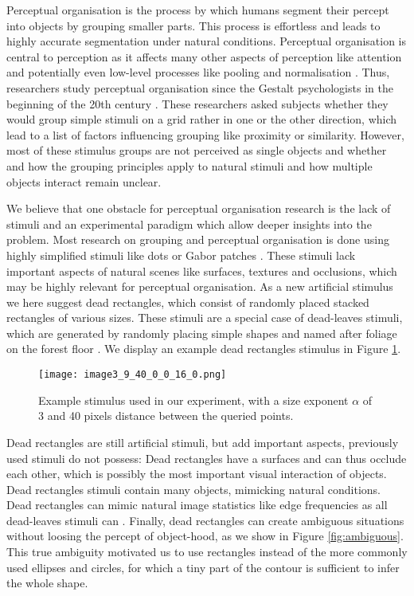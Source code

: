 \documentclass[10pt,letterpaper]{article}
\begin{document}
Perceptual organisation is the process by which humans segment their percept into objects by grouping smaller parts. This process is effortless and leads to highly accurate segmentation under natural conditions. 
Perceptual organisation is central to perception as it affects many other aspects of perception like attention \cite{soto2004} and potentially even low-level processes like pooling and normalisation \cite{neri2011,coen-cagli2015}. 
Thus, researchers study perceptual organisation since the Gestalt psychologists in the beginning of the 20th century \cite{koffka1935}. These researchers asked subjects whether they would group simple stimuli on a grid rather in one or the other direction, which lead to a list of factors influencing grouping like proximity or similarity. However, most of these stimulus groups are not perceived as single objects and whether and how the grouping principles apply to natural stimuli and how multiple objects interact remain unclear.

We believe that one obstacle for perceptual organisation research is the lack of stimuli and an experimental paradigm which allow deeper insights into the problem. Most research on grouping and perceptual organisation is done using highly simplified stimuli like dots \cite{feldman2006} or Gabor patches \cite{field1993}. These stimuli lack important aspects of natural scenes like surfaces, textures and occlusions, which may be highly relevant for perceptual organisation.  
As a new artificial stimulus we here suggest dead rectangles, which consist of randomly placed stacked rectangles of various sizes. These stimuli are a special case of dead-leaves stimuli, which are generated by randomly placing simple shapes and named after foliage on the forest floor \cite{lee2001, gousseau2007, pitkow2010, zoran2012}. We display an example dead rectangles stimulus in Figure \ref{fig:example_stim}. 

\begin{figure}
\begin{center}
\texttt{[image: image3\_9\_40\_0\_0\_16\_0.png]}
\end{center}
\caption{Example stimulus used in our experiment, with a size exponent $\alpha$ of 3 and 40 pixels distance between the queried points.
\label{fig:example_stim}}
\end{figure}

Dead rectangles are still artificial stimuli, but add important aspects, previously used stimuli do not possess: Dead rectangles have a surfaces and can thus occlude each other, which is possibly the most important visual interaction of objects. Dead rectangles stimuli contain many objects, mimicking natural conditions. Dead rectangles can mimic natural image statistics like edge frequencies as all dead-leaves stimuli can \cite{gousseau2007,pitkow2010}. Finally, dead rectangles can create ambiguous situations without loosing the percept of object-hood, as we show in Figure \ref{fig:ambiguous}. This true ambiguity motivated us to use rectangles instead of the more commonly used ellipses and circles, for which a tiny part of the contour is sufficient to infer the whole shape.  
\end{document}
